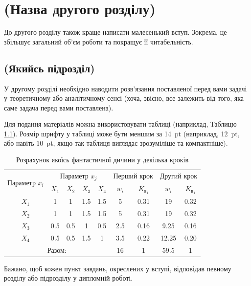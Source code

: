 \chapter{(Назва другого розділу)}
\label{chap:theory}

До другого розділу також краще написати малесенький вступ. Зокрема, це 
збільшує загальний об'єм роботи та покращує її читабельність.

\section{(Якийсь підрозділ)}

У другому розділі необхідно наводити розв'язання поставленої перед вами 
задачі у теоретичному або аналітичному сенсі (хоча, звісно, все залежить 
від того, яка саме задача перед вами поставлена).

Для подання матеріалів можна використовувати таблиці (наприклад, 
Таблицю \ref{tab_weight}). Розмір шрифту у таблиці може бути меншим за 14~pt (наприклад, 12~pt, або навіть 10~pt, якщо так таблиця виглядає зрозуміліше та компактніше).

    \begin{table}[ht]
    \setfontsize{14pt}
    \caption{Розрахунок якоїсь фантастичної дичини у декілька кроків}
    \label{tab_weight}
    \centering
        \begin{tabular}{|c|c|c|c|c|c|c|c|c|}
        \hline \multirow{2}{*}{Параметр $x_i$} & \multicolumn{4}{c|}{Параметр $x_j$} & 
            \multicolumn{2}{c|}{Перший крок} & \multicolumn{2}{c|}{Другий крок} \\
        \cline{2-9} & $X_1$ & $X_2$ & $X_3$ & $X_4$ & $w_i$ & 
            ${K_\text{в}}_i$ & $w_i$ & ${K_\text{в}}_i$ \\
        \hline $X_1$ & 1 & 1 & 1.5 & 1.5 & 5 & 0.31 & 19 & 0.32 \\
        \hline $X_2$ & 1 & 1 & 1.5 & 1.5 & 5 & 0.31 & 19 & 0.32 \\
        \hline $X_3$ & 0.5 & 0.5 & 1 & 0.5 & 2.5 & 0.16 & 9.25 & 0.16 \\
        \hline $X_4$ & 0.5 & 0.5 & 1.5 & 1 & 3.5 & 0.22 & 12.25 & 0.20 \\
        \hline \multicolumn{5}{|c|}{Разом:} & 16 & 1 & 59.5 & 1 \\
        \hline
        \end{tabular}
    \end{table}

Бажано, щоб кожен пункт завдань, окреслених у вступі, відповідав певному 
розділу або підрозділу у дипломній роботі.

